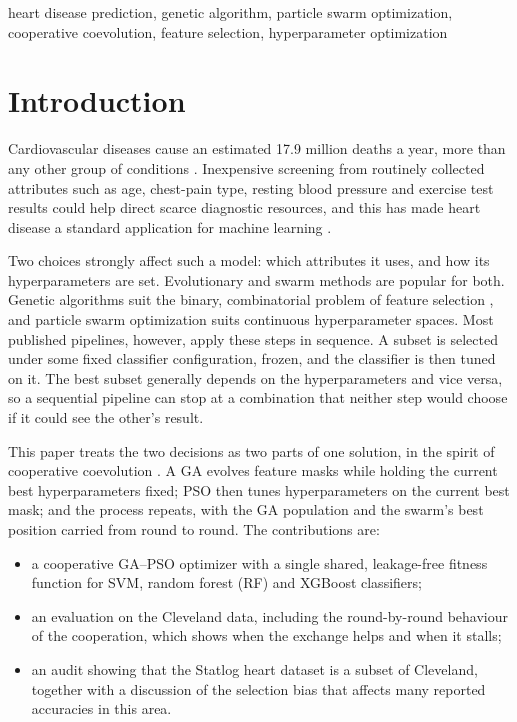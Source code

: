 \documentclass[conference]{IEEEtran}
\begin{document}
\begin{IEEEkeywords}
heart disease prediction, genetic algorithm, particle swarm optimization, cooperative coevolution, feature selection, hyperparameter optimization
\end{IEEEkeywords}

\section{Introduction}
Cardiovascular diseases cause an estimated 17.9 million deaths a year, more than any other group of conditions \cite{who2021cvd}. Inexpensive screening from routinely collected attributes such as age, chest-pain type, resting blood pressure and exercise test results could help direct scarce diagnostic resources, and this has made heart disease a standard application for machine learning \cite{detrano1989,uci_heart}.

Two choices strongly affect such a model: which attributes it uses, and how its hyperparameters are set. Evolutionary and swarm methods are popular for both. Genetic algorithms \cite{holland1975,goldberg1989} suit the binary, combinatorial problem of feature selection \cite{xue2016fssurvey}, and particle swarm optimization \cite{kennedy1995pso,shi1998inertia} suits continuous hyperparameter spaces. Most published pipelines, however, apply these steps in sequence. A subset is selected under some fixed classifier configuration, frozen, and the classifier is then tuned on it. The best subset generally depends on the hyperparameters and vice versa, so a sequential pipeline can stop at a combination that neither step would choose if it could see the other's result.

This paper treats the two decisions as two parts of one solution, in the spirit of cooperative coevolution \cite{potter1994cc}. A GA evolves feature masks while holding the current best hyperparameters fixed; PSO then tunes hyperparameters on the current best mask; and the process repeats, with the GA population and the swarm's best position carried from round to round. The contributions are:
\begin{itemize}
\item a cooperative GA--PSO optimizer with a single shared, leakage-free fitness function for SVM, random forest (RF) and XGBoost classifiers;
\item an evaluation on the Cleveland data, including the round-by-round behaviour of the cooperation, which shows when the exchange helps and when it stalls;
\item an audit showing that the Statlog heart dataset is a subset of Cleveland, together with a discussion of the selection bias that affects many reported accuracies in this area.
\end{itemize}
\end{document}
